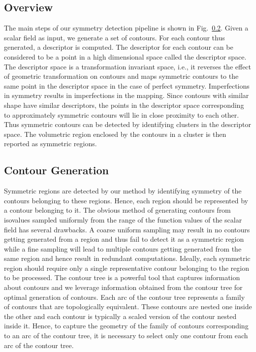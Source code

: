 \documentclass[review,journal]{vgtc}         %
\begin{document}
\subsection{Overview}
The main steps of our symmetry detection pipeline is shown in Fig.~\ref{}.
Given a scalar field as input, we generate a set of contours. For each contour
thus generated, a descriptor is computed. The descriptor for each contour
can be considered to be a point in a high dimensional space called the
descriptor space. The descriptor space is a transformation invariant space,
i.e., it reverses the effect of geometric transformation on contours and maps
symmetric contours to the same point in the descriptor space in the case of perfect
symmetry. Imperfections in symmetry results in imperfections in the mapping.
Since contours with similar shape have similar descriptors,
the points in the descriptor space corresponding to approximately symmetric 
contours will lie in close proximity to each other. Thus symmetric contours
can be detected by identifying clusters in the descriptor space. The volumetric
region enclosed by the contours in a cluster is then reported as
symmetric regions.
\subsection{Contour Generation}
Symmetric regions are detected by our method by identifying symmetry of the contours 
belonging to these regions. Hence, each region should be represented 
by a contour belonging to it. The obvious method of generating contours from isovalues
sampled uniformly from the range of the function values of the scalar field has several
drawbacks. A coarse uniform sampling may result in no contours getting generated from
a region and thus fail to detect it as a symmetric region while a fine sampling will lead
to multiple contours getting generated from the same region and hence result in redundant
computations. Ideally, each symmetric region should require only a single representative
contour belonging to the region to be processed.
The contour tree is a powerful tool that captures information about contours and we leverage
information obtained from the contour tree for optimal generation of contours. Each arc of
the contour tree represents a family of contours that are topologically equivalent. These
contours are nested one inside the other and each contour is typically a scaled version
of the contour nested inside it. Hence, to capture the geometry of the family
of contours corresponding to an arc of the contour tree, it is necessary to select only one
contour from each arc of the contour tree.
\end{document}
